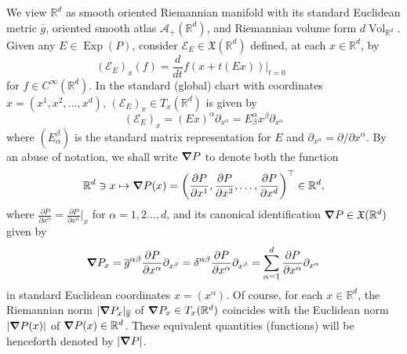 \documentclass[11pt]{article}
\theoremstyle{remark}
\newcommand\Exp{\operatorname{Exp}}
\newcommand{\Vol}{\operatorname{Vol}}
\begin{document}
\noindent We view $\mathbb{R}^d$ as smooth oriented Riemannian manifold with its standard Euclidean metric $\overline{g}$, oriented smooth atlas $\mathcal{A}_+(\mathbb{R}^d)$, and Riemannian volume form $ d\Vol_{\mathbb{R}^d}$. Given any $E\in\Exp(P)$, consider $\mathcal{E}_E\in \mathfrak{X}(\mathbb{R}^d)$ defined, at each $x\in\mathbb{R}^d$, by
\begin{equation*}
    (\mathcal{E}_E)_x(f)=\frac{d}{dt}f(x+t(Ex))\big\vert_{t=0}\hspace{1cm}
\end{equation*}
for $f\in C^\infty(\mathbb{R}^d)$. In the standard (global) chart with coordinates $x=(x^1,x^2,\dots,x^d)$, $(\mathcal{E}_E)_{x}\in T_{x}(\mathbb{R}^d)$ is given by
\begin{equation*}
    (\mathcal{E}_E)_{x}=(Ex)^{\alpha}\partial_{x^\alpha}=E^\alpha_\beta x^{\beta}\partial_{x^\alpha}
\end{equation*}
where $(E_\alpha^\beta)$ is the standard matrix representation for $E$ and  $\partial_{x^{\alpha}}=\partial/\partial x^\alpha$. By an abuse of notation, we shall write $\grad P$ to denote both the function
\begin{equation*}
\mathbb{R}^d\ni x\mapsto \grad P(x)=\left(\frac{\partial P}{\partial x^1},\frac{\partial P}{\partial x^2},\dots,\frac{\partial P}{\partial x^d}\right)^{\top}\in\mathbb{R}^d,
\end{equation*}
where $\frac{\partial P}{\partial x^{\alpha}}=\frac{\partial P}{\partial x^{\alpha}}\vert_{x}$ for $\alpha=1,2\dots,d$, and its canonical identification $\grad P\in \mathfrak{X}(\mathbb{R}^d)$ given by \begin{equation*}
    \grad P_x=\overline{g}^{\alpha\beta}\frac{\partial P}{\partial x^{\alpha}}\partial_{x^{\beta}}=\delta^{\alpha\beta}\frac{\partial P}{\partial x^{\alpha}}\partial_{x^{\beta}}=\sum_{\alpha=1}^d\frac{\partial P}{\partial x^{\alpha}}\partial_{x^\alpha}
\end{equation*}
in standard Euclidean coordinates $x=(x^\alpha)$. Of course, for each $x\in\mathbb{R}^d$, the Riemannian norm $|\grad P_x |_{\overline{g}}$ of $\grad P_x \in T_x (\mathbb{R}^d)$ coincides with the Euclidean norm $| \grad P(x) |$ of $ \grad P(x) \in \mathbb{R}^d$. These equivalent quantities (functions) will be henceforth denoted by $|\grad P|$.
\end{document}
